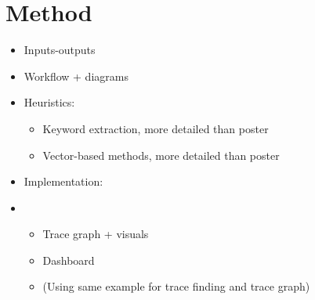 \documentclass[conference]{IEEEtran}
\begin{document}

\section{Method}
\label{section:method}

\begin{itemize}
    \item Inputs-outputs
    \item Workflow + diagrams
    \item Heuristics:
    \begin{itemize}
        \item Keyword extraction, more detailed than poster
        \item Vector-based methods, more detailed than poster
    \end{itemize}
    \item Implementation:
    \item \begin{itemize}
        \item Trace graph + visuals
        \item Dashboard
        \item (Using same example for trace finding and trace graph)
    \end{itemize}
\end{itemize}


\end{document}

